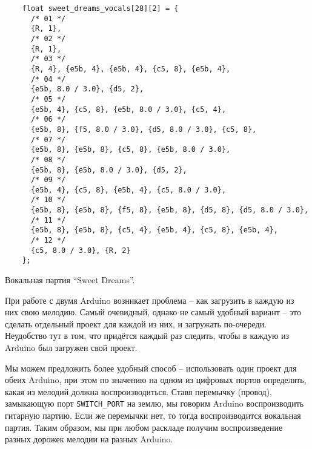 \documentclass[../sparc.tex]{subfiles}
\begin{document}
\begin{listing}[!h]
  \begin{verbatim}
    float sweet_dreams_vocals[28][2] = {
      /* 01 */
      {R, 1},
      /* 02 */
      {R, 1},
      /* 03 */
      {R, 4}, {e5b, 4}, {e5b, 4}, {c5, 8}, {e5b, 4},
      /* 04 */
      {e5b, 8.0 / 3.0}, {d5, 2},
      /* 05 */
      {e5b, 4}, {c5, 8}, {e5b, 8.0 / 3.0}, {c5, 4},
      /* 06 */
      {e5b, 8}, {f5, 8.0 / 3.0}, {d5, 8.0 / 3.0}, {c5, 8},
      /* 07 */
      {e5b, 8}, {e5b, 8}, {c5, 8}, {e5b, 8.0 / 3.0},
      /* 08 */
      {e5b, 8}, {e5b, 8.0 / 3.0}, {d5, 2},
      /* 09 */
      {e5b, 4}, {c5, 8}, {e5b, 4}, {c5, 8.0 / 3.0},
      /* 10 */
      {e5b, 8}, {e5b, 8}, {f5, 8}, {e5b, 8}, {d5, 8}, {d5, 8.0 / 3.0},
      /* 11 */
      {e5b, 8}, {e5b, 8}, {c5, 4}, {e5b, 4}, {c5, 8}, {e5b, 4},
      /* 12 */
      {c5, 8.0 / 3.0}, {R, 2}
    };
  \end{verbatim}
  \label{listing:music-band-sweet-dreams-2}
  \caption{Вокальная партия ``Sweet Dreams''.}
\end{listing}

При работе с двумя Arduino возникает проблема -- как загрузить в каждую из них
свою мелодию.  Самый очевидный, однако не самый удобный вариант -- это сделать
отдельный проект для каждой из них, и загружать по-очереди.  Неудобство тут в
том, что придётся каждый раз следить, чтобы в каждую из Arduino был загружен
свой проект.

Мы можем предложить более удобный способ -- использовать один проект для обеих
Arduino, при этом по значению на одном из цифровых портов определять, какая из
мелодий должна воспроизводиться.  Ставя перемычку (провод), замыкающую порт
\texttt{SWITCH\_PORT} на землю, мы говорим Arduino воспроизводить гитарную
партию.  Если же перемычки нет, то тогда воспроизводится вокальная партия.
Таким образом, мы при любом раскладе получим воспроизведение разных дорожек
мелодии на разных Arduino.
\end{document}
